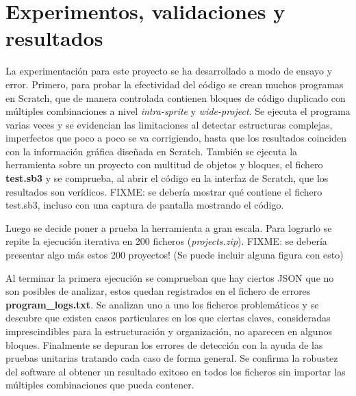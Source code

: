 \documentclass[a4paper, 12pt]{book}
\begin{document}



\cleardoublepage
\chapter{Experimentos, validaciones y resultados}


La experimentación para este proyecto se ha desarrollado a modo de ensayo y error. Primero, para probar la efectividad del código se crean muchos programas en Scratch, que de manera controlada contienen bloques de código duplicado con múltiples combinaciones a nivel \textit{intra-sprite} y \textit{wide-project}. Se ejecuta el programa varias veces y se evidencian las limitaciones al detectar estructuras complejas, imperfectos que poco a poco se va corrigiendo, hasta que los resultados coinciden con la información gráfica diseñada en Scratch. También se ejecuta la herramienta sobre un proyecto con multitud de objetos y bloques, el fichero \textbf{test.sb3} y se comprueba, al abrir el código en la interfaz de Scratch, que los resultados son verídicos. FIXME: se debería mostrar qué contiene el fichero test.sb3, incluso con una captura de pantalla mostrando el código.

Luego se decide poner a prueba la herramienta a gran escala. Para lograrlo se repite la ejecución iterativa en 200 ficheros (\textit{projects.zip}). FIXME: se debería presentar algo más estos 200 proyectos! (Se puede incluir alguna figura con esto)

Al terminar la primera ejecución se comprueban que hay ciertos JSON que no son posibles de analizar, estos quedan registrados en el fichero de errores \textbf{program\_logs.txt}. Se analizan uno a uno los ficheros problemáticos y se descubre que existen casos particulares en los que ciertas claves, consideradas imprescindibles para la estructuración y organización, no aparecen en algunos bloques. Finalmente se depuran los errores de detección con la ayuda de las pruebas unitarias tratando cada caso de forma general. Se confirma la robustez del software al obtener un resultado exitoso en todos los ficheros sin importar las múltiples combinaciones que pueda contener.
\end{document}
